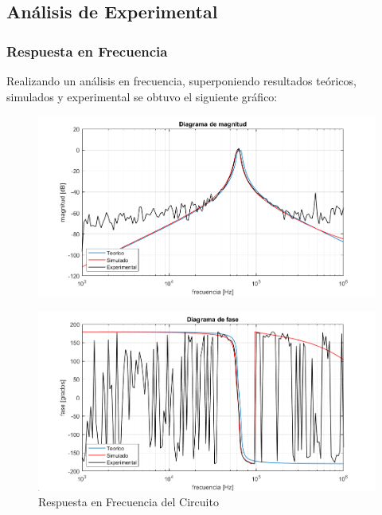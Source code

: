 \subsection{Análisis de Experimental}

\subsubsection{Respuesta en Frecuencia}

Realizando un análisis en frecuencia, superponiendo resultados teóricos, simulados y experimental se obtuvo el siguiente gráfico:

\begin{figure}[H]
    \centering
    \includegraphics[scale = 0.6]{../Ejercicio2-DisenoDeCeldas/2CELDARAUCH/Informe/bodemag.png}
\end{figure}
\begin{figure}[H]
    \centering
    \includegraphics[scale = 0.6]{../Ejercicio2-DisenoDeCeldas/2CELDARAUCH/Informe/bodepha.png}
    \caption{Respuesta en Frecuencia del Circuito}
    \label{ej22bode}
\end{figure}

